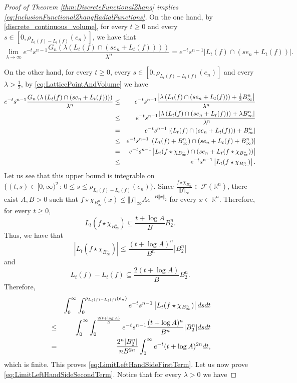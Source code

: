 \documentclass{amsart}
\newcommand{\R}{\mathbb R}
\theoremstyle{remark}
\theoremstyle{definition}
\numberwithin{equation}{section}
\begin{document}
\begin{proof}[Proof of Theorem \ref{thm:DiscreteFunctionalZhang} implies \eqref{eq:InclusionFunctionalZhangRadialFunctions}]
On the one hand, by \eqref{discrete_continuous_volume}, for every $t\geq0$ and every $s\in[0,\rho_{L_t(f)-L_t(f)}(e_n)]$, we have that
$$
\lim_{\lambda\to\infty}e^{-t}s^{n-1}\frac{G_n\left(\lambda\left(L_t(f)\cap(se_n+L_t(f))\right)\right)}{\lambda^n}=e^{-t}s^{n-1}|L_t(f)\cap (se_n+L_t(f))|.
$$

On the other hand, for every $t\geq0$, every $s\in[0,\rho_{L_t(f)-L_t(f)}(e_n)]$ and every $\lambda>\frac{1}{2}$, by \eqref{eq:LatticePointAndVolume} we have
\begin{eqnarray*}
e^{-t}s^{n-1}\frac{G_n\left(\lambda\left(L_t(f)\cap(se_n+L_t(f))\right)\right)}{\lambda^n}&\leq&e^{-t}s^{n-1}\frac{\left|\lambda\left(L_t(f)\cap(se_n+L_t(f))\right)+\frac{1}{2}B_\infty^n\right|}{\lambda^n}\cr
&\leq&e^{-t}s^{n-1}\frac{\left|\lambda\left(L_t(f)\cap(se_n+L_t(f))\right)+\lambda B_\infty^n\right|}{\lambda^n}\cr
&=&e^{-t}s^{n-1}\left|\left(L_t(f)\cap(se_n+L_t(f))\right)+B_\infty^n\right|\cr
&\leq&e^{-t}s^{n-1}\left|(L_t(f)+B_\infty^n)\cap(se_n+L_t(f)+B_\infty^n)\right|\cr
&=&e^{-t}s^{n-1}\left|L_t(f\star\chi_{B_\infty^n})\cap(se_n+L_t(f\star\chi_{B_\infty^n}))\right|\cr
&\leq&e^{-t}s^{n-1}\left|L_t(f\star\chi_{B_\infty^n})\right|.
\end{eqnarray*}
Let us see that this upper bound is integrable on $\{(t,s)\in[0,\infty)^2\,:\,0\leq s\leq \rho_{L_t(f)-L_t(f)}(e_n)\}$. Since $\frac{f\star\chi_{B_\infty^n}}{\Vert f\Vert_\infty}\in\mathcal{F}(\R^n)$, there exist $A,B>0$ such that $f\star\chi_{B_\infty^n} (x)\leq \Vert f\Vert_\infty A e^{-B\Vert x\Vert_2}$ for every $x\in\R^n$. Therefore, for every $t\geq0$,
\begin{equation}\label{eq:inclusionInBall}
L_t(f\star\chi_{B_\infty^n})\subseteq\frac{t+\log A}{B} B_2^n.
\end{equation}
Thus, we have that
$$
\left|L_t(f\star\chi_{B_\infty^n})\right|\leq\frac{(t+\log A)^{n}}{B^{n}}|B_2^{n}|
$$
and
\begin{equation}\label{eq:InclusionDifferenceBodyInBall}
L_t(f)-L_t(f)\subseteq \frac{2(t+\log A)}{B} B_2^n.
\end{equation}
Therefore,
\begin{eqnarray*}
&&\int_0^\infty \int_0^{\rho_{L_t(f)-L_t(f)}(e_n)}e^{-t}s^{n-1}\left|L_t(f\star\chi_{B_\infty^n})\right|dsdt\cr
&\leq&\int_0^\infty\int_0^{\frac{2(t+\log A)}{B}}e^{-t}s^{n-1}\frac{(t+\log A)^{n}}{B^{n}}|B_2^{n}|dsdt\cr
&=&\frac{2^n|B_2^n|}{nB^{2n}}\int_0^\infty e^{-t}(t+\log A)^{2n}dt,
\end{eqnarray*}
which is finite. This proves \eqref{eq:LimitLeftHandSideFirstTerm}. Let us now prove \eqref{eq:LimitLeftHandSideSecondTerm}. Notice that for every $\lambda>0$ we have

\end{proof}
\end{document}
